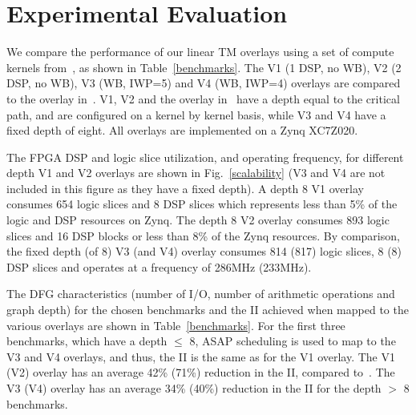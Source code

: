 \section{Experimental Evaluation}
\label{ch5_experiments}

We compare the performance of our linear TM overlays using a set of compute kernels from~\cite{jain2015efficient,binipolynomial}, as shown in Table~\ref{benchmarks}.
The V1 (1 DSP, no WB), V2 (2 DSP, no WB), V3 (WB, IWP=5) and V4 (WB, IWP=4) overlays are compared to the overlay in~\cite{li2016area}. 
V1, V2 and the overlay in~\cite{li2016area} have a depth equal to the critical path, and are configured on a kernel by kernel basis, while V3 and V4 have a fixed depth of eight. 
All overlays are implemented on a Zynq XC7Z020.

The FPGA DSP and logic slice utilization, and operating frequency, for different depth V1 and V2 overlays are shown in Fig.~\ref{scalability} (V3 and V4 are not included in this figure as they have a fixed depth). A depth 8 V1 overlay consumes 654 logic slices and 8 DSP slices which represents less than 5\% of the logic and DSP resources on Zynq. The depth 8 V2 overlay consumes 893 logic slices and 16 DSP blocks or less than 8\% of the Zynq resources. 
By comparison, the fixed depth (of 8) V3 (and V4) overlay consumes 814 (817) logic slices, 8 (8) DSP slices and operates at a frequency of 286MHz (233MHz).

The DFG characteristics (number of I/O, number of arithmetic operations and graph depth) for the chosen benchmarks and the II achieved when mapped to the various overlays are shown in Table~\ref{benchmarks}. For the first three benchmarks, which have a depth $\leq$ 8, ASAP scheduling is used to map to the V3 and V4 overlays, and thus, the II is the same as for the V1 overlay. 
The V1 (V2) overlay has an average 42\% (71\%) reduction in the II, compared to~\cite{li2016area}.
The V3 (V4) overlay has an average 34\% (40\%) reduction in the II for the depth $>$ 8 benchmarks.

\begin{comment}
Among the feed-forward only overlays such as~\cite{li2016area}, V1, and V2, their requirement for the number of FUs is determined by the graph depth of each benchmark. 
The II is high for benchmarks with a large number of I/O nodes and high parallelism, where parallelism stands for the average number of operations per schedule stage.
It can be used to roughly measure the throughput, as all the three overlays run at a frequency with a slight degradation from around 330MHz to 300MHz on Zynq XC7Z020, as shown in Fig.~\ref{fmax}. 
According to Table~\ref{benchmarks} and Fig.~\ref{resources}, V1 generally reduces the II into half with almost the same resource consumption as~\cite{li2016area}, and V2 further achieves down to a quarter with an incremental area overhead.
As there are no loop carried dependencies, we can replicate multiple streaming models as in Fig.~\ref{pipelines} to reduce the II into a theoretical minimum of 1.
\end{comment}

